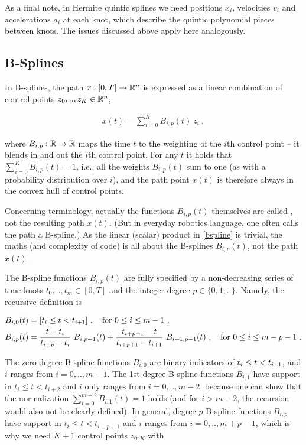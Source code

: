 As a final note, in Hermite quintic splines we need positions $x_i$, velocities $v_i$ and accelerations $a_i$ at each knot, which describe the quintic polynomial pieces between knots. The issues discussed above apply here analogously.

\subsection{B-Splines}

In B-splines, the path $x: [0,T] \to {\mathbb{R}}^n$ is expressed as a linear combination of control points $z_0,.., z_K \in {\mathbb{R}}^n$,

\begin{align}\label{bspline}
x(t) = \sum_{i=0}^K B_{i,p}(t)~ z_i ~,
\end{align}

where $B_{i,p}: {\mathbb{R}} \to {\mathbb{R}}$ maps the time $t$ to the weighting of the $i$th control point -- it blends in and out the $i$th control point. For any $t$ it  holds that $\sum_{i=0}^K B_{i,p}(t) = 1$, i.e., all the weights $B_{i,p}(t)$ sum to one (as with a probability distribution over $i$), and the path point $x(t)$ is therefore always in the convex hull of control points.

Concerning terminology, actually the functions $B_{i,p}(t)$ themselves
are called , not the resulting path $x(t)$. (But in everyday robotics language, one often calls the path a B-spline.) As the linear (scalar) product in \eqref{bspline} is trivial, the maths (and complexity of code) is all about the B-splines $B_{i,p}(t)$, not the path $x(t)$.

The B-spline functions $B_{i,p}(t)$ are fully specified by a non-decreasing series of time knots $t_0,..,t_m \in [0,T]$ and the integer degree $p\in\{0,1,..\}$. Namely, the recursive definition is

\begin{align}
B_{i,0}(t) &= [t_i \le t < t_{i{{\hspace*{-.0pt}\text{\rm +}\hspace*{-.5pt}}1}}] ~,\quad \text{for $0\le i \le m-1$} ~,\\
B_{i,p}(t)
&= \frac{t-t_i}{t_{i+p}-t_i}~ B_{i,p-1}(t)
 +  \frac{t_{i+p+1}-t}{t_{i+p+1}-t_{i+1}}~ B_{i+1,p-1}(t)  ~,\quad \text{for $0\le i \le m-p-1$} ~.
\end{align}


The zero-degree B-spline functions $B_{i,0}$ are binary indicators of $t_i \le t < t_{i{{\hspace*{-.0pt}\text{\rm +}\hspace*{-.5pt}}1}}$, and $i$ ranges from $i=0,..,m-1$. The 1st-degree B-spline functions $B_{i,1}$ have support in $t_i \le t < t_{i+2}$ and $i$ only ranges from
$i=0,..,m-2$, because one can show that the normalization $\sum_{i=0}^{m-2} B_{i,1}(t) = 1$ holds (and for $i>m-2$, the recursion would also not be clearly defined). In general, degree $p$ B-spline functions $B_{i,p}$ have support in $t_i \le t < t_{i+p+1}$ and $i$ ranges from $i=0,..,m+p-1$, which is why we need $K+1$ control points $z_{0:K}$ with

